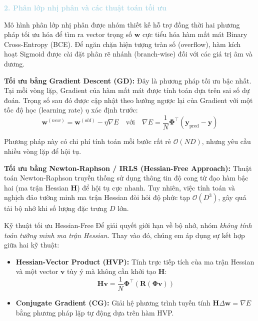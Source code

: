 \vspace{0.5em}
\noindent\textcolor{lightblue}{\textbf{2. Phân lớp nhị phân và các thuật toán tối ưu}}
\vspace{0.5em}

Mô hình phân lớp nhị phân được nhóm thiết kế hỗ trợ đồng thời hai phương pháp tối ưu hóa để tìm ra vector trọng số $\mathbf{w}$ cực tiểu hóa hàm mất mát Binary Cross-Entropy (BCE). Để ngăn chặn hiện tượng tràn số (overflow), hàm kích hoạt Sigmoid được cài đặt phân rẽ nhánh (branch-wise) đối với các giá trị âm và dương.

\textbf{Tối ưu bằng Gradient Descent (GD):} Đây là phương pháp tối ưu bậc nhất. Tại mỗi vòng lặp, Gradient của hàm mất mát được tính toán dựa trên sai số dự đoán. Trọng số sau đó được cập nhật theo hướng ngược lại của Gradient với một tốc độ học (learning rate) $\eta$ xác định trước:
\begin{equation}
    \mathbf{w}^{(new)} = \mathbf{w}^{(old)} - \eta \nabla E \quad \text{với} \quad \nabla E = \frac{1}{N} \mathbf{\Phi}^\top (\mathbf{y}_{\text{pred}} - \mathbf{y})
\end{equation}

Phương pháp này có chi phí tính toán mỗi bước rất rẻ $\mathcal{O}(ND)$, nhưng yêu cầu nhiều vòng lặp để hội tụ.

\textbf{Tối ưu bằng Newton-Raphson / IRLS (Hessian-Free Approach):} Thuật toán Newton-Raphson truyền thống sử dụng thông tin độ cong từ đạo hàm bậc hai (ma trận Hessian $\mathbf{H}$) để hội tụ cực nhanh. Tuy nhiên, việc tính toán và nghịch đảo tường minh ma trận Hessian đòi hỏi độ phức tạp $\mathcal{O}(D^3)$, gây quá tải bộ nhớ khi số lượng đặc trưng $D$ lớn.

\begin{importantbox}{Kỹ thuật tối ưu Hessian-Free}
Để giải quyết giới hạn về bộ nhớ, nhóm \textit{không tính toán tường minh ma trận Hessian}. Thay vào đó, chúng em áp dụng sự kết hợp giữa hai kỹ thuật:
\begin{itemize}
    \item \textbf{Hessian-Vector Product (HVP):} Tính trực tiếp tích của ma trận Hessian và một vector $\mathbf{v}$ tùy ý mà không cần khởi tạo $\mathbf{H}$:
    \begin{equation}
        \mathbf{H}\mathbf{v} = \frac{1}{N} \mathbf{\Phi}^\top \left( \mathbf{R} (\mathbf{\Phi} \mathbf{v}) \right)
    \end{equation}
    \item \textbf{Conjugate Gradient (CG):} Giải hệ phương trình tuyến tính $\mathbf{H} \Delta \mathbf{w} = \nabla E$ bằng phương pháp lặp tự động dựa trên hàm HVP.
\end{itemize}
\end{importantbox}

